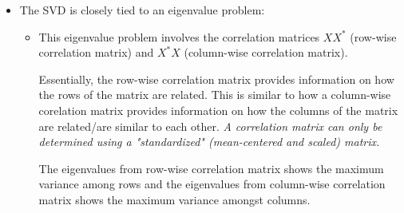 \documentclass[11.5pt,a4paper]{article}
\begin{document}
\begin{itemize}
    \item The SVD is closely tied to an eigenvalue problem:
    \begin{itemize}
        \item This eigenvalue problem involves the correlation matrices $XX^*$ (row-wise correlation matrix) and $X^*X$ (column-wise correlation matrix). 
        
        Essentially, the row-wise correlation matrix provides information on how the rows of the matrix are related. This is similar to how a column-wise corelation matrix provides information on how the columns of the matrix are related/are similar to each other. \textit{A correlation matrix can only be determined using a "standardized" (mean-centered and scaled) matrix.}

        The eigenvalues from row-wise correlation matrix shows the maximum variance among rows and the eigenvalues from column-wise correlation matrix shows the maximum variance amongst columns.
        

\end{itemize}
\end{itemize}
\end{document}

